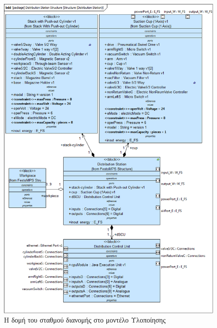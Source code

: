 \documentclass[a4paper,12pt,twoside]{report}
\begin{document}
\begin{appendices}
				\begin{figure}[hp]
					\centering
					\includegraphics[scale=0.50]{DesignModel_Structure(DistributionStation).png}
					\caption{Η δομή του σταθμού διανομής στο μοντέλο Υλοποίησης}
					\label{φωτ:Η δομή του σταθμού διανομής στο μοντέλο Υλοποίησης}
				\end{figure}
				

\end{appendices}
\end{document}
